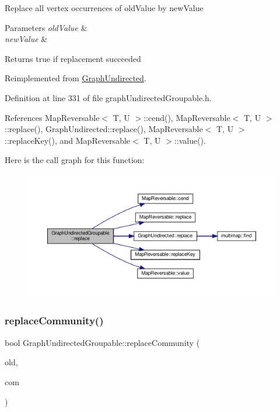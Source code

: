Replace all vertex occurrences of old\+Value by new\+Value


\begin{DoxyParams}{Parameters}
{\em old\+Value} & \\
\hline
{\em new\+Value} & \\
\hline
\end{DoxyParams}
\begin{DoxyReturn}{Returns}
true if replacement succeeded 
\end{DoxyReturn}


Reimplemented from \hyperlink{classGraphUndirected_aee3bc279ffe39f8efb7dd60865279474}{Graph\+Undirected}.



Definition at line 331 of file graph\+Undirected\+Groupable.\+h.



References Map\+Reversable$<$ T, U $>$\+::cend(), Map\+Reversable$<$ T, U $>$\+::replace(), Graph\+Undirected\+::replace(), Map\+Reversable$<$ T, U $>$\+::replace\+Key(), and Map\+Reversable$<$ T, U $>$\+::value().

Here is the call graph for this function\+:\nopagebreak
\begin{figure}[H]
\begin{center}
\leavevmode
\includegraphics[width=350pt]{classGraphUndirectedGroupable_a164600ca9727676ad7b370b9061927d4_cgraph}
\end{center}
\end{figure}
\mbox{\label{classGraphUndirectedGroupable_af29e653d9578b955e47288e075ebf47f}} 
\subsubsection{\texorpdfstring{replace\+Community()}{replaceCommunity()}}
{\footnotesize\ttfamily bool Graph\+Undirected\+Groupable\+::replace\+Community (\begin{DoxyParamCaption}\item[{const \hyperlink{graphUndirectedGroupable_8h_a914da95c9ea7f14f4b7f875c36818556}{type\+Community} \&}]{old,  }\item[{const \hyperlink{graphUndirectedGroupable_8h_a914da95c9ea7f14f4b7f875c36818556}{type\+Community} \&}]{com }\end{DoxyParamCaption})\hspace{0.3cm}{\ttfamily [inline]}}

